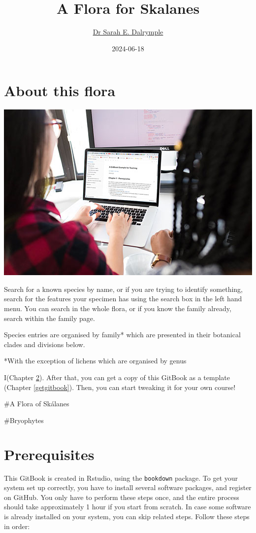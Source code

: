 \documentclass[
]{book}
\title{A Flora for Skalanes}
\author{\href{https://www.ljmu.ac.uk}{Dr Sarah E. Dalrymple}}
\date{2024-06-18}
\begin{document}
\maketitle

{
\setcounter{tocdepth}{1}
\tableofcontents
}
\chapter{About this flora}\label{about-this-flora}

\includegraphics{./img/using_gitbook.jpeg}

Search for a known species by name, or if you are trying to identify something, search for the features your specimen has using the search box in the left hand menu. You can search in the whole flora, or if you know the family already, search within the family page.

Species entries are organised by family* which are presented in their botanical clades and divisions below.

*With the exception of lichens which are organised by genus

I(Chapter \ref{prerequisites}). After that, you can get a copy of this GitBook as a template (Chapter \ref{getgitbook}). Then, you can start tweaking it for your own course!

\#A Flora of Skálanes

\#Bryophytes

\chapter{Prerequisites}\label{prerequisites}

This GitBook is created in Rstudio, using the \texttt{bookdown} package. To get your system set up correctly, you have to install several software packages, and register on GitHub. You only have to perform these steps once, and the entire process should take approximately 1 hour if you start from scratch. In case some software is already installed on your system, you can skip related steps. Follow these steps in order:
\end{document}
